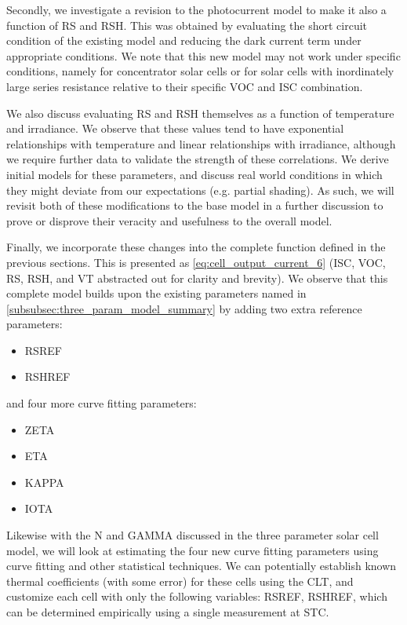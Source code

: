 Secondly, we investigate a revision to the photocurrent model to make it also a
function of \ac{RS} and \ac{RSH}. This was obtained by evaluating the short
circuit condition of the existing model and reducing the dark current term under
appropriate conditions. We note that this new model may not work under specific
conditions, namely for concentrator solar cells or for solar cells with
inordinately large series resistance relative to their specific \ac{VOC} and
\ac{ISC} combination.

We also discuss evaluating \ac{RS} and \ac{RSH} themselves as a function of
temperature and irradiance. We observe that these values tend to have
exponential relationships with temperature and linear relationships with
irradiance, although we require further data to validate the strength of these
correlations. We derive initial models for these parameters, and discuss real
world conditions in which they might deviate from our expectations (e.g. partial
shading). As such, we will revisit both of these modifications to the base model
in a further discussion to prove or disprove their veracity and usefulness to
the overall model.

Finally, we incorporate these changes into the complete function defined in the
previous sections. This is presented as \autoref{eq:cell_output_current_6}
(\ac{ISC}, \ac{VOC}, \ac{RS}, \ac{RSH}, and \ac{VT} abstracted out for clarity
and brevity). We observe that this complete model builds upon the existing
parameters named in \autoref{subsubsec:three_param_model_summary} by adding two
extra reference parameters:

\begin{itemize}
    \item \acf{RSREF}
    \item \acf{RSHREF}
\end{itemize}

and four more curve fitting parameters:

\begin{itemize}
    \item \acf{ZETA}
    \item \acf{ETA}
    \item \acf{KAPPA}
    \item \acf{IOTA}
\end{itemize}

Likewise with the \acf{N} and \acf{GAMMA} discussed in the three parameter solar
cell model, we will look at estimating the four new curve fitting parameters
using curve fitting and other statistical techniques. We can potentially
establish known thermal coefficients (with some error) for these cells using the
\ac{CLT}, and customize each cell with only the following variables: \ac{RSREF},
\ac{RSHREF}, which can be determined empirically using a single measurement at
\ac{STC}.


